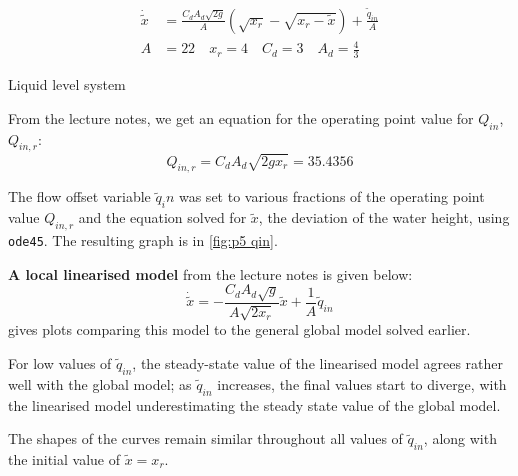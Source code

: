 \problem

\begin{captioneq}[h]
	\centering
	\begin{align*}
		\label{eq:p5 system}
		\dot{\tilde{x}} &= \frac{C_dA_d\sqrt{2g}}{A}\left(\sqrt{x_r}-\sqrt{x_r-\tilde{x}}\right)+\frac{\tilde{q}_{in}}{A}\\
		A&=22\quad x_r = 4\quad  C_d=3\quad  A_d=\frac{4}{3}
	\end{align*}
	\caption{Liquid level system}
\end{captioneq}

From the lecture notes, we get an equation for the operating point value for $Q_{in}$, $Q_{in,r}$:
\begin{equation}
	\label{eq:p5 lin}
Q_{in,r} = C_dA_d\sqrt{2gx_r} = 35.4356
\end{equation}

The flow offset variable $\tilde{q}_in$ was set to various fractions of the operating point value $Q_{in,r}$ and the equation solved for $\tilde{x}$, the deviation of the water height, using \texttt{ode45}. The resulting graph is in \cref{fig:p5 qin}.


\textbf{A local linearised model} from the lecture notes is given below:
$$
\dot{\tilde{x}} = - \frac{C_dA_d\sqrt{g}}{A\sqrt{2x_r}}\tilde{x} + \frac{1}{A}\tilde{q}_{in} 
$$
 gives plots comparing this model to the general global model solved earlier.

For low values of $\tilde{q}_{in}$, the steady-state value of the linearised model agrees rather well with the global model; as $\tilde{q}_{in}$ increases, the final values start to diverge, with the linearised model underestimating the steady state value of the global model.

The shapes of the curves remain similar throughout all values of $\tilde{q}_{in}$, along with the initial value of $\tilde{x}=x_r$.

